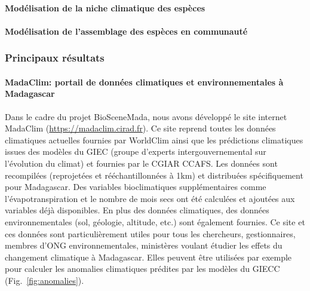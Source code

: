 \documentclass[12pt,]{article}
\let\oldparagraph\paragraph
\renewcommand{\paragraph}[1]{\oldparagraph{#1}\mbox{}}
\begin{document}
\hypertarget{modelisation-de-la-niche-climatique-des-especes}{%
\paragraph{Modélisation de la niche climatique des
espèces}\label{modelisation-de-la-niche-climatique-des-especes}}

\hypertarget{modelisation-de-lassemblage-des-especes-en-communaute}{%
\paragraph{Modélisation de l'assemblage des espèces en
communauté}\label{modelisation-de-lassemblage-des-especes-en-communaute}}

\hypertarget{principaux-resultats}{%
\subsubsection{Principaux résultats}\label{principaux-resultats}}

\hypertarget{madaclim-portail-de-donnees-climatiques-et-environnementales-a-madagascar-1}{%
\paragraph{MadaClim: portail de données climatiques et environnementales
à
Madagascar}\label{madaclim-portail-de-donnees-climatiques-et-environnementales-a-madagascar-1}}

Dans le cadre du projet BioSceneMada, nous avons développé le site
internet MadaClim (\url{https://madaclim.cirad.fr}). Ce site reprend
toutes les données climatiques actuelles fournies par WorldClim ainsi
que les prédictions climatiques issues des modèles du GIEC (groupe
d'experts intergouvernemental sur l'évolution du climat) et fournies par
le CGIAR CCAFS. Les données sont recompilées (reprojetées et
rééchantillonnées à 1km) et distribuées spécifiquement pour Madagascar.
Des variables bioclimatiques supplémentaires comme l'évapotranspiration
et le nombre de mois secs ont été calculées et ajoutées aux variables
déjà disponibles. En plus des données climatiques, des données
environnementales (sol, géologie, altitude, etc.) sont également
fournies. Ce site et ces données sont particulièrement utiles pour tous
les chercheurs, gestionnaires, membres d'ONG environnementales,
ministères voulant étudier les effets du changement climatique à
Madagascar. Elles peuvent être utilisées par exemple pour calculer les
anomalies climatiques prédites par les modèles du GIECC
(Fig.~\ref{fig:anomalies}).
\end{document}
